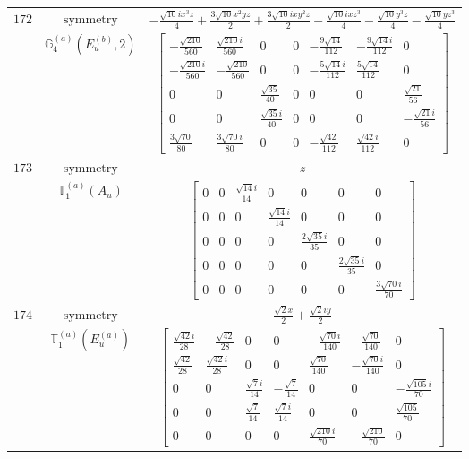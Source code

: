 \documentclass[fleqn,8pt,landscape]{jsarticle}
\begin{document}
\begin{longtable}{ccc}
$ 172 $ & $ \text{symmetry} $ & $ - \frac{\sqrt{10} i x^{3} z}{4} + \frac{3 \sqrt{10} x^{2} y z}{2} + \frac{3 \sqrt{10} i x y^{2} z}{2} - \frac{\sqrt{10} i x z^{3}}{4} - \frac{\sqrt{10} y^{3} z}{4} - \frac{\sqrt{10} y z^{3}}{4} $ \\
$  $ & $ \mathbb{G}_{4}^{(a)}(E_{u}^{(b)},2) $ & $ \begin{bmatrix} - \frac{\sqrt{210}}{560} & \frac{\sqrt{210} i}{560} & 0 & 0 & - \frac{9 \sqrt{14}}{112} & - \frac{9 \sqrt{14} i}{112} & 0 \\ - \frac{\sqrt{210} i}{560} & - \frac{\sqrt{210}}{560} & 0 & 0 & - \frac{5 \sqrt{14} i}{112} & \frac{5 \sqrt{14}}{112} & 0 \\ 0 & 0 & \frac{\sqrt{35}}{40} & 0 & 0 & 0 & \frac{\sqrt{21}}{56} \\ 0 & 0 & \frac{\sqrt{35} i}{40} & 0 & 0 & 0 & - \frac{\sqrt{21} i}{56} \\ \frac{3 \sqrt{70}}{80} & \frac{3 \sqrt{70} i}{80} & 0 & 0 & - \frac{\sqrt{42}}{112} & \frac{\sqrt{42} i}{112} & 0 \end{bmatrix} $ \\ \hline
$ 173 $ & $ \text{symmetry} $ & $ z $ \\
$  $ & $ \mathbb{T}_{1}^{(a)}(A_{u}) $ & $ \begin{bmatrix} 0 & 0 & \frac{\sqrt{14} i}{14} & 0 & 0 & 0 & 0 \\ 0 & 0 & 0 & \frac{\sqrt{14} i}{14} & 0 & 0 & 0 \\ 0 & 0 & 0 & 0 & \frac{2 \sqrt{35} i}{35} & 0 & 0 \\ 0 & 0 & 0 & 0 & 0 & \frac{2 \sqrt{35} i}{35} & 0 \\ 0 & 0 & 0 & 0 & 0 & 0 & \frac{3 \sqrt{70} i}{70} \end{bmatrix} $ \\ \hline
$ 174 $ & $ \text{symmetry} $ & $ \frac{\sqrt{2} x}{2} + \frac{\sqrt{2} i y}{2} $ \\
$  $ & $ \mathbb{T}_{1}^{(a)}(E_{u}^{(a)}) $ & $ \begin{bmatrix} \frac{\sqrt{42} i}{28} & - \frac{\sqrt{42}}{28} & 0 & 0 & - \frac{\sqrt{70} i}{140} & - \frac{\sqrt{70}}{140} & 0 \\ \frac{\sqrt{42}}{28} & \frac{\sqrt{42} i}{28} & 0 & 0 & \frac{\sqrt{70}}{140} & - \frac{\sqrt{70} i}{140} & 0 \\ 0 & 0 & \frac{\sqrt{7} i}{14} & - \frac{\sqrt{7}}{14} & 0 & 0 & - \frac{\sqrt{105} i}{70} \\ 0 & 0 & \frac{\sqrt{7}}{14} & \frac{\sqrt{7} i}{14} & 0 & 0 & \frac{\sqrt{105}}{70} \\ 0 & 0 & 0 & 0 & \frac{\sqrt{210} i}{70} & - \frac{\sqrt{210}}{70} & 0 \end{bmatrix} $ \\ \hline

\end{longtable}
\end{document}
